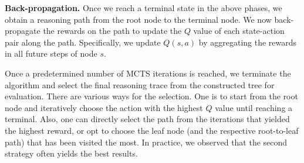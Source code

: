 
\noindent \textbf{Back-propagation.} 
Once we reach a terminal state in the above phases, we obtain a reasoning path from the root node to the terminal node. We now back-propagate the rewards on the path to update the $Q$ value of each state-action pair along the path. Specifically, we update $Q(s, a)$ by aggregating the rewards in all future steps of node $s$. 

Once a predetermined number of MCTS iterations is reached, we terminate the algorithm and select the final reasoning trace from the constructed tree for evaluation. There are various ways for the selection.
One is to start from the root node and iteratively choose the action with the highest $Q$ value until reaching a terminal.
Also, one can directly select the path from the iterations that yielded the highest reward, or opt to choose the leaf node (and the respective root-to-leaf path) that has been visited the most.
In practice, we observed that the second strategy often yields the best results.


